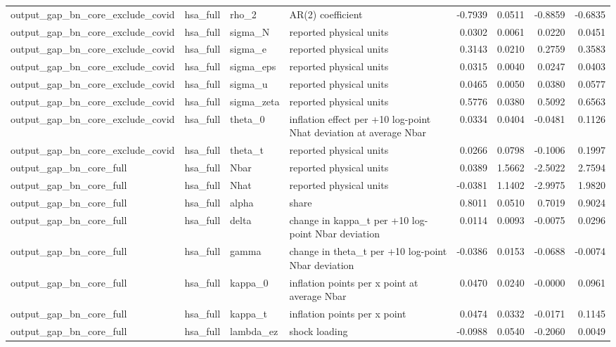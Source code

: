 \begin{tabular}{llllrrrr}
output\_gap\_bn\_core\_exclude\_covid & hsa\_full & rho\_2 & AR(2) coefficient & -0.7939 & 0.0511 & -0.8859 & -0.6835 \\
output\_gap\_bn\_core\_exclude\_covid & hsa\_full & sigma\_N & reported physical units & 0.0302 & 0.0061 & 0.0220 & 0.0451 \\
output\_gap\_bn\_core\_exclude\_covid & hsa\_full & sigma\_e & reported physical units & 0.3143 & 0.0210 & 0.2759 & 0.3583 \\
output\_gap\_bn\_core\_exclude\_covid & hsa\_full & sigma\_eps & reported physical units & 0.0315 & 0.0040 & 0.0247 & 0.0403 \\
output\_gap\_bn\_core\_exclude\_covid & hsa\_full & sigma\_u & reported physical units & 0.0465 & 0.0050 & 0.0380 & 0.0577 \\
output\_gap\_bn\_core\_exclude\_covid & hsa\_full & sigma\_zeta & reported physical units & 0.5776 & 0.0380 & 0.5092 & 0.6563 \\
output\_gap\_bn\_core\_exclude\_covid & hsa\_full & theta\_0 & inflation effect per +10 log-point Nhat deviation at average Nbar & 0.0334 & 0.0404 & -0.0481 & 0.1126 \\
output\_gap\_bn\_core\_exclude\_covid & hsa\_full & theta\_t & reported physical units & 0.0266 & 0.0798 & -0.1006 & 0.1997 \\
output\_gap\_bn\_core\_full & hsa\_full & Nbar & reported physical units & 0.0389 & 1.5662 & -2.5022 & 2.7594 \\
output\_gap\_bn\_core\_full & hsa\_full & Nhat & reported physical units & -0.0381 & 1.1402 & -2.9975 & 1.9820 \\
output\_gap\_bn\_core\_full & hsa\_full & alpha & share & 0.8011 & 0.0510 & 0.7019 & 0.9024 \\
output\_gap\_bn\_core\_full & hsa\_full & delta & change in kappa\_t per +10 log-point Nbar deviation & 0.0114 & 0.0093 & -0.0075 & 0.0296 \\
output\_gap\_bn\_core\_full & hsa\_full & gamma & change in theta\_t per +10 log-point Nbar deviation & -0.0386 & 0.0153 & -0.0688 & -0.0074 \\
output\_gap\_bn\_core\_full & hsa\_full & kappa\_0 & inflation points per x point at average Nbar & 0.0470 & 0.0240 & -0.0000 & 0.0961 \\
output\_gap\_bn\_core\_full & hsa\_full & kappa\_t & inflation points per x point & 0.0474 & 0.0332 & -0.0171 & 0.1145 \\
output\_gap\_bn\_core\_full & hsa\_full & lambda\_ez & shock loading & -0.0988 & 0.0540 & -0.2060 & 0.0049 \\

\end{tabular}

